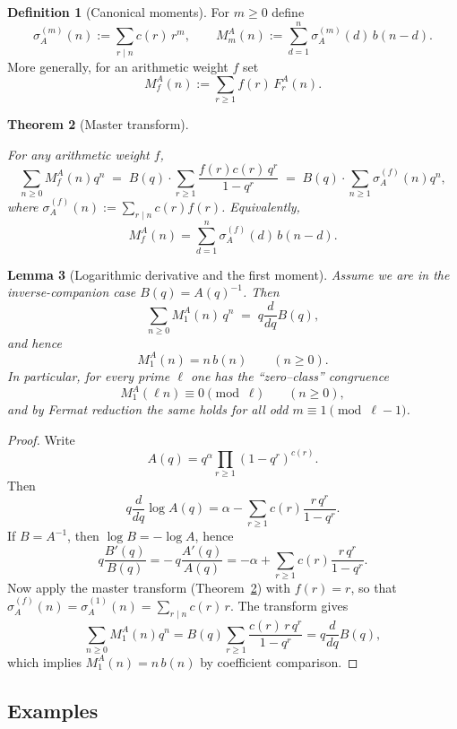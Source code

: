 \documentclass[11pt]{article}
\newtheorem{theorem}{Theorem}[section]
\newtheorem{lemma}[theorem]{Lemma}
\theoremstyle{definition}
\newtheorem{definition}[theorem]{Definition}
\theoremstyle{remark}
\begin{document}
\begin{definition}[Canonical moments]
For $m\ge0$ define
\[
\sigma^{(m)}_A(n):=\sum_{r\mid n} c(r)\,r^m,\qquad
M^A_m(n):=\sum_{d=1}^{n} \sigma^{(m)}_A(d)\,b(n-d).
\]
More generally, for an arithmetic weight $f$ set
\[
M^A_f(n):=\sum_{r\ge1} f(r)\,F^A_r(n).
\]
\end{definition}

\begin{theorem}[Master transform]\label{thm:master-transform}

For any arithmetic weight $f$,
\[
\sum_{n\ge0} M^A_f(n)q^n
\;=\;B(q)\cdot \sum_{r\ge1}\frac{f(r)c(r)\,q^r}{1-q^r}
\;=\;B(q)\cdot \sum_{n\ge1}\sigma^{(f)}_A(n)q^n,
\]
where $\sigma^{(f)}_A(n):=\sum_{r\mid n} c(r)f(r)$. Equivalently,
\[
M^A_f(n)=\sum_{d=1}^n \sigma^{(f)}_A(d)\,b(n-d).
\]
\end{theorem}
\begin{lemma}[Logarithmic derivative and the first moment]\label{lem:logderiv-M1}
Assume we are in the inverse-companion case $B(q)=A(q)^{-1}$.  Then
\[
\sum_{n\ge0} M^{A}_1(n)\,q^n \;=\; q\frac{d}{dq}B(q),
\]
and hence
\[
M^{A}_1(n)=n\,b(n)\qquad(n\ge0).
\]
In particular, for every prime $\ell$ one has the ``zero--class'' congruence
\[
M^{A}_1(\ell n)\equiv 0\pmod{\ell}\qquad(n\ge0),
\]
and by Fermat reduction the same holds for all odd $m\equiv 1\pmod{\ell-1}$.
\end{lemma}

\begin{proof}
Write
\[
A(q)=q^\alpha\prod_{r\ge1}(1-q^r)^{c(r)}.
\]
Then
\[
q\frac{d}{dq}\log A(q)=\alpha-\sum_{r\ge1}c(r)\frac{r\,q^r}{1-q^r}.
\]
If $B=A^{-1}$, then $\log B=-\log A$, hence
\[
q\frac{B'(q)}{B(q)}=-\,q\frac{A'(q)}{A(q)}
=-\alpha+\sum_{r\ge1}c(r)\frac{r\,q^r}{1-q^r}.
\]
Now apply the master transform (Theorem~\ref{thm:master-transform}) with $f(r)=r$,
so that $\sigma_A^{(f)}(n)=\sigma_A^{(1)}(n)=\sum_{r\mid n}c(r)\,r$.  The transform
gives
\[
\sum_{n\ge0}M_1^{A}(n)q^n
= B(q)\sum_{r\ge1}\frac{c(r)\,r\,q^r}{1-q^r}
= q\frac{d}{dq}B(q),
\]
which implies $M_1^{A}(n)=n\,b(n)$ by coefficient comparison.
\end{proof}

\subsection{Examples}
\end{document}
